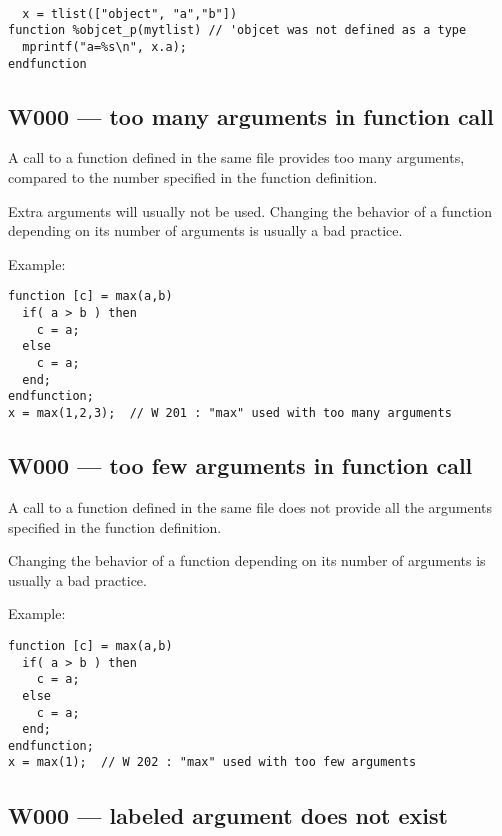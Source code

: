 \begin{verbatim}

  x = tlist(["object", "a","b"])
function %objcet_p(mytlist) // 'objcet was not defined as a type
  mprintf("a=%s\n", x.a);
endfunction
\end{verbatim}


\subsection{W000 --- too many arguments in function call}




A call to a function defined in the same file provides too many
arguments, compared to the number specified in the function definition.



Extra arguments will usually not be used. Changing the behavior
of a function depending on its number of arguments is usually a bad
practice.



Example:\begin{verbatim}
function [c] = max(a,b)
  if( a > b ) then
    c = a;
  else
    c = a;
  end;
endfunction;
x = max(1,2,3);  // W 201 : "max" used with too many arguments
\end{verbatim}




\subsection{W000 --- too few arguments in function call }




A call to a function defined in the same file does not provide all the
arguments specified in the function definition.



Changing the behavior of a function depending on its number of
arguments is usually a bad practice.



Example:\begin{verbatim}
function [c] = max(a,b)
  if( a > b ) then
    c = a;
  else
    c = a;
  end;
endfunction;
x = max(1);  // W 202 : "max" used with too few arguments
\end{verbatim}




\subsection{W000 --- labeled argument does not exist}


